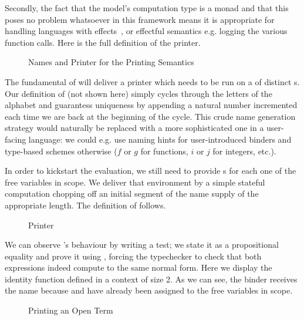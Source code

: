 Secondly, the fact that the model's computation type is a monad and that this
poses no problem whatsoever in this framework means it is appropriate for
handling languages with effects~\cite{moggi1991notions}, or effectful
semantics e.g. logging the various function calls. Here is the full definition
of the printer.

\begin{figure}[h]
\begin{minipage}{0.5\textwidth}
\end{minipage}
\begin{minipage}{0.5\textwidth}
\end{minipage}
\caption{Names and Printer for the Printing Semantics\label{fig:semprint}}
\end{figure}


The fundamental  of  will deliver a printer which needs to be run
on a  of distinct s. Our definition of  (not
shown here) simply cycles through the letters of the alphabet and guarantess
uniqueness by appending a natural number incremented each time we are back at
the beginning of the cycle. This crude name generation strategy would naturally
be replaced with a more sophisticated one in a user-facing language: we could
e.g. use naming hints for user-introduced binders and type-based schemes otherwise
($f$ or $g$ for functions, $i$ or $j$ for integers, etc.).

In order to kickstart the evaluation, we still need to provide s
for each one of the free variables in scope. We deliver that environment
by a simple stateful computation  chopping off an initial segment
of the name supply of the appropriate length. The definition of 
follows.

\begin{figure}[h]
\caption{Printer\label{fig:printer}}
\end{figure}

We can observe 's behaviour by writing a test; we state it as a
propositional equality and prove it using , forcing the typechecker
to check that both expressions indeed compute to the same normal form. Here
we display the identity function defined in a context of size 2. As we can see,
the binder receives the name  because  and  have
already been assigned to the free variables in scope.

\begin{figure}[h]
\caption{Printing an Open Term\label{fig:printtest}}
\end{figure}
